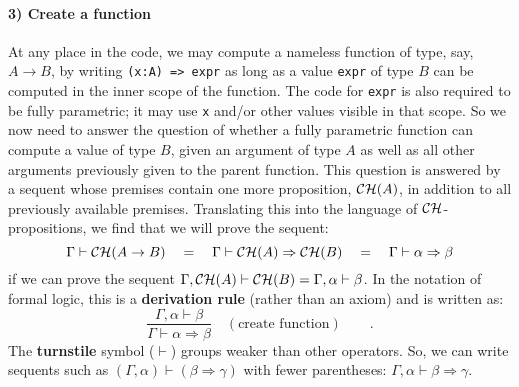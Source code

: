 \paragraph{3) Create a function}

At any place in the code, we may compute a nameless function of type,
say, $A\rightarrow B$, by writing \lstinline!(x:A) => expr! as long
as a value \lstinline!expr! of type $B$ can be computed in the inner
scope of the function. The code for \lstinline!expr! is also required
to be fully parametric; it may use \lstinline!x! and/or other values
visible in that scope. So we now need to answer the question of whether
a fully parametric function can compute a value of type $B$, given
an argument of type $A$ as well as all other arguments previously
given to the parent function. This question is answered by a sequent
whose premises contain one more proposition, ${\cal CH}(A)$, in addition
to all previously available premises. Translating this into the language
of ${\cal CH}$-propositions, we find that we will prove the sequent:
\[
\Gamma\vdash{\cal CH}(A\rightarrow B)\quad=\quad\Gamma\vdash{\cal CH}(A)\Rightarrow{\cal CH}(B)\quad=\quad\Gamma\vdash\alpha\Rightarrow\beta
\]
if we can prove the sequent $\Gamma,{\cal CH}(A)\vdash{\cal CH}(B)=\Gamma,\alpha\vdash\beta$.
In the notation of formal logic, this is a \textbf{derivation rule}
(rather than an axiom) and is written as:
\[
\frac{\Gamma,\alpha\vdash\beta}{\Gamma\vdash\alpha\Rightarrow\beta}\quad(\text{create function})\quad\quad.
\]
The \textbf{turnstile}
symbol ($\vdash$) groups weaker than other operators. So, we can
write sequents such as $(\Gamma,\alpha)\vdash(\beta\Rightarrow\gamma)$
with fewer parentheses: $\Gamma,\alpha\vdash\beta\Rightarrow\gamma$.

